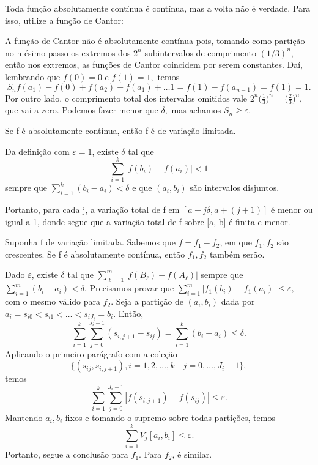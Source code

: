 \documentclass[MeasureTheory/measure_theory.tex]{subfiles}
\begin{document}
Toda função absolutamente contínua é contínua, mas a volta não é verdade. Para isso, utilize a função de Cantor:
\begin{example}
	A função de Cantor não é absolutamente contínua pois, tomando como partição no n-ésimo passo os extremos dos \(2^{n}\) subintervalos de comprimento \((1/3)^{n},\) então nos extremos, as funções de Cantor coincidem por serem constantes. Daí, lembrando que \(f(0) = 0 \) e \(f(1) = 1,\) temos
	\[
		S_{n} f(a_1) - f(0) + f(a_2) - f(a_1) + \dotsc  1 = f(1) - f(a_{n-1}) = f(1) = 1.
	\]
	Por outro lado, o comprimento total dos intervalos omitidos vale \(2^{n}\biggl(\frac{1}{3}\biggr)^{n} = \biggl(\frac{2}{3}\biggr)^{n},\) que vai a zero. Podemos fazer menor que \(\delta ,\) mas achamos \(S_{n} \geq \varepsilon \).
\end{example}
\begin{lemma*}
	Se f é absolutamente contínua, então f é de variação limitada.
\end{lemma*}
\begin{proof*}
	Da definição com \(\varepsilon  = 1\), existe \(\delta  \) tal que
	\[
		\sum\limits_{i=1}^{k}|f(b_{i}) - f(a_{i})| < 1
	\]
	sempre que \(\sum\limits_{i=1}^{k}(b_{i} - a_{i}) < \delta \) e que \((a_{i}, b_{i})\) são intervalos disjuntos.

	Portanto, para cada j, a variação total de f em \([a + j\delta, a + (j+1)]\) é menor ou igual a 1, donde segue que a variação total de f sobre [a, b] é finita e menor. \qedsymbol
\end{proof*}
\begin{lemma*}
	Suponha f de variação limitada. Sabemos que \( f = f_1 - f_2\), em que \(f_1, f_2\) são crescentes. Se f é absolutamente contínua, então \(f_1, f_2\) também serão.
\end{lemma*}
\begin{proof*}
	Dado \(\varepsilon \), existe \(\delta \) tal que \(\sum\limits_{\ell =1}^{m}|f(B_{\ell }) - f(A_{\ell })|\) sempre que \(\sum\limits_{i=1}^{m}(b_{i}-a_{i}) < \delta .\) Precisamos provar que \(\sum\limits_{i=1}^{m}|f_1(b_{i}) - f_1(a_{i})|\leq \varepsilon ,\) com o mesmo válido para \(f_2\).
	Seja a partição de \((a_{i}, b_{i})\) dada por \(a_{i} = s_{i0} < s_{i1} < \dotsc <s_{iJ_{i}} = b_{i}.\) Então,
	\[
		\sum\limits_{i=1}^{k}\sum\limits_{j=0}^{J_{i}-1}(s_{i, j+1} - s_{ij}) = \sum\limits_{i=1}^{k}(b_{i}-a_{i})\leq \delta .
	\]
	Aplicando o primeiro parágrafo com a coleção
	\[
		\{(s_{ij}, s_{i, j+1}), i = 1, 2, \dotsc , k\quad j = 0, \dotsc , J_{i}-1\},
	\]
	temos
	\[
		\sum\limits_{i=1}^{k}\sum\limits_{j=0}^{J_{i}-1}|f(s_{i, j+1}) - f(s_{ij})|\leq \varepsilon .
	\]
	Mantendo \(a_{i}, b_{i}\) fixos e tomando o supremo sobre todas partições, temos
	\[
		\sum\limits_{i=1}^{k}V_j[a_{i}, b_{i}] \leq \varepsilon .
	\]
	Portanto, segue a conclusão para \(f_1.\) Para \(f_2\), é similar. \qedsymbol
\end{proof*}
\end{document}
